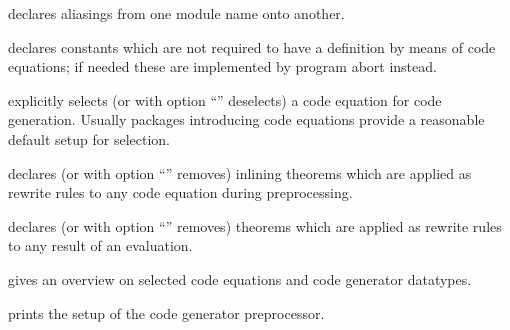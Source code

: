 \begin{isabellebody}
\begin{isamarkuptext}
\begin{description}
  \item \hyperlink{command.HOL.code-modulename}{\mbox{}} declares aliasings from one
  module name onto another.

  \item \hyperlink{command.HOL.code-abort}{\mbox{}} declares constants which are not
  required to have a definition by means of code equations; if
  needed these are implemented by program abort instead.

  \item \hyperlink{attribute.HOL.code}{\mbox{}} explicitly selects (or with option
  ``'' deselects) a code equation for code
  generation.  Usually packages introducing code equations provide
  a reasonable default setup for selection.

  \item \hyperlink{attribute.HOL.code-inline}{\mbox{}} declares (or with
  option ``'' removes) inlining theorems which are
  applied as rewrite rules to any code equation during
  preprocessing.

  \item \hyperlink{attribute.HOL.code-post}{\mbox{}} declares (or with
  option ``'' removes) theorems which are
  applied as rewrite rules to any result of an evaluation.

  \item \hyperlink{command.HOL.print-codesetup}{\mbox{}} gives an overview on
  selected code equations and code generator datatypes.

  \item \hyperlink{command.HOL.print-codeproc}{\mbox{}} prints the setup
  of the code generator preprocessor.


\end{description}
\end{isamarkuptext}
\end{isabellebody}
